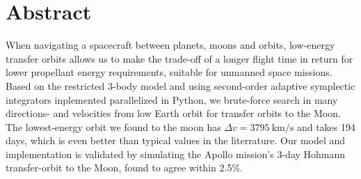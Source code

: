 \chapter{Abstract}
When navigating a spacecraft between planets, moons and orbits, low-energy transfer orbits allows us to make the trade-off of a longer flight time in return for lower propellant energy requirements, suitable for unmanned space missions. Based on the restricted 3-body model and using second-order adaptive symplectic integrators inplemented parallelized in Python, we brute-force search in many directions- and velocities from low Earth orbit for transfer orbits to the Moon. The lowest-energy orbit we found to the moon has $\Delta v = \SI{3795}{\km\per\s}$ and takes 194 days, which is even better than typical values in the literrature. Our model and implementation is validated by simulating the Apollo mission's 3-day Hohmann transfer-orbit to the Moon, found to agree within 2.5\%.